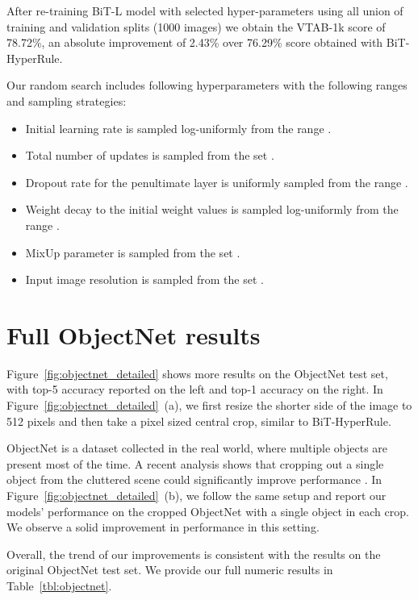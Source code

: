 \documentclass[runningheads]{llncs}
\newcommand{\name}{{BiT}}
\newcommand{\hyper}{{BiT-HyperRule}}
\begin{document}
After re-training \name{}-L model with selected hyper-parameters using all union of training and validation splits (1000 images) we obtain the VTAB-1k score of 78.72\%, an absolute improvement of 2.43\% over 76.29\% score obtained with BiT-HyperRule.


Our random search includes following hyperparameters with the following ranges and sampling strategies: 
\begin{itemize}
    \item Initial learning rate is sampled log-uniformly from the range .
    \item Total number of updates is sampled from the set .
    \item Dropout rate for the penultimate layer is uniformly sampled from the range .
    \item Weight decay to the initial weight values is sampled  log-uniformly from the range   .
    \item MixUp  parameter is sampled from the set .
    \item Input image resolution is sampled from the set . 
\end{itemize}

\clearpage

\section{Full ObjectNet results}
\label{sec:objectnet-detailed-results}

Figure~\ref{fig:objectnet_detailed} shows more results on the ObjectNet test set, with top-5 accuracy reported on the left and top-1 accuracy on the right.
In Figure~\ref{fig:objectnet_detailed}~(a), we first resize the shorter side of the image to 512 pixels and then take a  pixel sized central crop, similar to \hyper{}.

ObjectNet is a dataset collected in the real world, where multiple objects are present most of the time.
A recent analysis shows that cropping out a single object from the cluttered scene could significantly improve performance \cite{borji2020reobjectnet}. 
In Figure~\ref{fig:objectnet_detailed}~(b), we follow the same setup and report our models' performance on the cropped ObjectNet with a single object in each crop.
We observe a solid improvement in performance in this setting.

Overall, the trend of our improvements is consistent with the results on the original ObjectNet test set.
We provide our full numeric results in Table~\ref{tbl:objectnet}.
\end{document}
